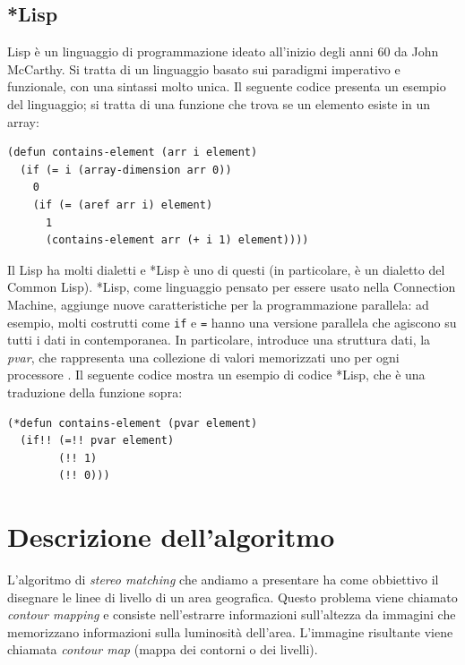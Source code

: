 \documentclass[12pt,a4paper,openright,twoside]{report}
\begin{document}
\section{*Lisp}

Lisp è un linguaggio di programmazione ideato all'inizio degli anni 60 da John McCarthy. Si tratta di un linguaggio basato sui paradigmi imperativo e funzionale, con una sintassi molto unica. Il seguente codice presenta un esempio del linguaggio; si tratta di una funzione che trova se un elemento esiste in un array:

\newpage

\begin{lstlisting}[caption={Esempio di codice Lisp. Questa funzione implementa la ricerca nell'array in maniera ricorsiva, in concordanza con il paradigma funzionale.}]
(defun contains-element (arr i element)
  (if (= i (array-dimension arr 0))
    0
    (if (= (aref arr i) element)
      1
      (contains-element arr (+ i 1) element))))
\end{lstlisting}

Il Lisp ha molti dialetti e *Lisp è uno di questi (in particolare, è un dialetto del Common Lisp). *Lisp, come linguaggio pensato per essere usato nella Connection Machine, aggiunge nuove caratteristiche per la programmazione parallela: ad esempio, molti costrutti come \verb|if| e \verb|=| hanno una versione parallela che agiscono su tutti i dati in contemporanea. In particolare, introduce una struttura dati, la \textit{pvar}, che rappresenta una collezione di valori memorizzati uno per ogni processore \cite{starlisp}. Il seguente codice mostra un esempio di codice *Lisp, che è una traduzione della funzione sopra:

\begin{lstlisting}[caption={Esempio di codice *Lisp. Questa versione della funzione implementa la ricerca in parallelo su tutti gli elementi dell'array.}]
(*defun contains-element (pvar element)
  (if!! (=!! pvar element)
        (!! 1)
        (!! 0)))
\end{lstlisting}

\chapter{Descrizione dell'algoritmo}

L'algoritmo di \textit{stereo matching} che andiamo a presentare ha come obbiettivo il disegnare le linee di livello di un area geografica. Questo problema viene chiamato \textit{contour mapping} e consiste nell'estrarre informazioni sull'altezza da immagini che memorizzano informazioni sulla luminosità dell'area. L'immagine risultante viene chiamata \textit{contour map} (mappa dei contorni o dei livelli).
\end{document}
